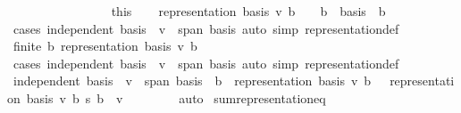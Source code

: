 \begin{isabellebody}
\ \ \ \ \ \ \isamarkupfalse%
\ {\isacharasterisk}{\kern0pt}\ \isacommand{{\isachardot}{\kern0pt}}\isamarkupfalse%
\ \isacommand{{\isacharbraceright}{\kern0pt}}\isamarkupfalse%
\isanewline
\ \ \isamarkupfalse%
\ {\isacharasterisk}{\kern0pt}\ {\isacharequal}{\kern0pt}\ this\isanewline
\isanewline
\ \ \isamarkupfalse%
\ {\isachardoublequoteopen}representation\ basis\ v\ b\ {\isasymnoteq}\ {}\ {\isasymLongrightarrow}\ b\ {\isasymin}\ basis{\isachardoublequoteclose}\ \ b\isanewline
\ \ \ \ \isamarkupfalse%
\ {\isacharasterisk}{\kern0pt}\ \isamarkupfalse%
\ {\isacharparenleft}{\kern0pt}cases\ {\isachardoublequoteopen}independent\ basis\ {\isasymand}\ v\ {\isasymin}\ span\ basis{\isachardoublequoteclose}{\isacharparenright}{\kern0pt}\ {\isacharparenleft}{\kern0pt}auto\ simp{\isacharcolon}{\kern0pt}\ representation{\isacharunderscore}{\kern0pt}def{\isacharparenright}{\kern0pt}\isanewline
\isanewline
\ \ \isamarkupfalse%
\ {\isachardoublequoteopen}finite\ {\isacharbraceleft}{\kern0pt}b{\isachardot}{\kern0pt}\ representation\ basis\ v\ b\ {\isasymnoteq}\ {}{\isacharbraceright}{\kern0pt}{\isachardoublequoteclose}\isanewline
\ \ \ \ \isamarkupfalse%
\ {\isacharasterisk}{\kern0pt}\ \isamarkupfalse%
\ {\isacharparenleft}{\kern0pt}cases\ {\isachardoublequoteopen}independent\ basis\ {\isasymand}\ v\ {\isasymin}\ span\ basis{\isachardoublequoteclose}{\isacharparenright}{\kern0pt}\ {\isacharparenleft}{\kern0pt}auto\ simp{\isacharcolon}{\kern0pt}\ representation{\isacharunderscore}{\kern0pt}def{\isacharparenright}{\kern0pt}\isanewline
\isanewline
\ \ \isamarkupfalse%
\ {\isachardoublequoteopen}independent\ basis\ {\isasymLongrightarrow}\ v\ {\isasymin}\ span\ basis\ {\isasymLongrightarrow}\ {\isacharparenleft}{\kern0pt}{\isasymSum}b\ {\isacharbar}{\kern0pt}\ representation\ basis\ v\ b\ {\isasymnoteq}\ {}{\isachardot}{\kern0pt}\ representation\ basis\ v\ b\ {\isacharasterisk}{\kern0pt}s\ b{\isacharparenright}{\kern0pt}\ {\isacharequal}{\kern0pt}\ v{\isachardoublequoteclose}\isanewline
\ \ \ \ \isamarkupfalse%
\ {\isacharasterisk}{\kern0pt}\ \isamarkupfalse%
\ auto\isanewline
{}\isamarkupfalse%
%
\endisatagproof
{\isafoldproof}%
%
\isadelimproof
\isanewline
%
\endisadelimproof
\isanewline
{}\isamarkupfalse%
\ sum{\isacharunderscore}{\kern0pt}representation{\isacharunderscore}{\kern0pt}eq{\isacharcolon}{\kern0pt}\isanewline

\end{isabellebody}
